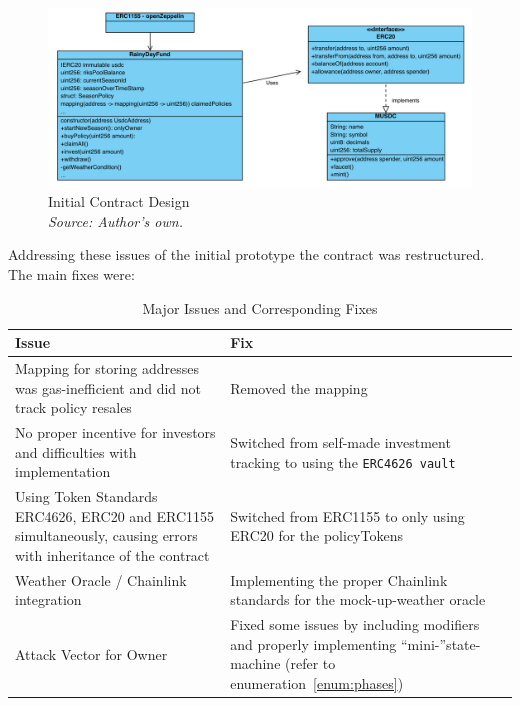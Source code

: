 \documentclass[11pt,a4paper]{article}
\begin{document}
	\begin{figure}[H]
		\centering
		\includegraphics[scale=0.5]{graphics/ClassDiagram_Old}
		\caption{Initial Contract Design \\ \textit{Source: Author's own.}}
		\label{fig:initial-contract-design}
	\end{figure}

	Addressing these issues of the initial prototype the contract was restructured.
    The main fixes were:

    \begin{table}[H]
        \centering
        \caption{Major Issues and Corresponding Fixes}
        \label{tab:issues-fixes}
        \begin{tabular}{|p{}|p{}|}
            \hline
            \textbf{Issue} & \textbf{Fix} \\
            \hline
            Mapping for storing addresses was gas-inefficient and did not track policy resales & Removed the mapping \\
            \hline
            No proper incentive for investors and difficulties with implementation & Switched from self-made investment tracking to using the \texttt{ERC4626 vault} \\
            \hline
            Using Token Standards ERC4626, ERC20 and ERC1155 simultaneously, causing errors with inheritance of the contract & Switched from ERC1155 to only using ERC20 for the policyTokens \\
            \hline
            Weather Oracle / Chainlink integration & Implementing the proper Chainlink standards for the mock-up-weather oracle~\parencite{AggregatorV3Interface} \\
            \hline
            Attack Vector for Owner & Fixed some issues by including modifiers and properly implementing \enquote{mini-}state-machine (refer to enumeration~\ref{enum:phases}) \\
            \hline
        \end{tabular}
    \end{table}
\end{document}
